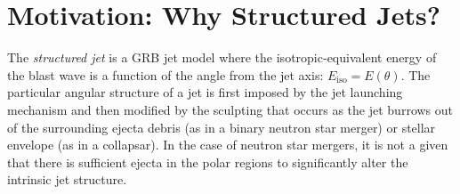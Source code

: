 \documentclass[twocolumn]{aastex62}
\newcommand{\gwbns}{GW170817A}
\newcommand{\beppoSAX}{{\em BeppoSAX}}
\newcommand{\Eiso}{\ensuremath{E_{\mathrm{iso}}}}
\begin{document}
%
%
%
%
%
%
%
%

%
%


\section{Motivation: Why Structured Jets?}\label{sec:motivation}

The \emph{structured jet} is a GRB jet model where the isotropic-equivalent energy of the blast wave is a function of the angle from the jet axis: $\Eiso = E(\theta)$. The particular angular structure of a jet is first imposed by the jet launching mechanism and then modified by the sculpting that occurs as the jet burrows out of the surrounding ejecta debris (as in a binary neutron star merger) or stellar envelope (as in a collapsar).  In the case of neutron star mergers, it is not a given that there is sufficient ejecta in the polar regions to significantly alter the intrinsic jet structure.
\end{document}
